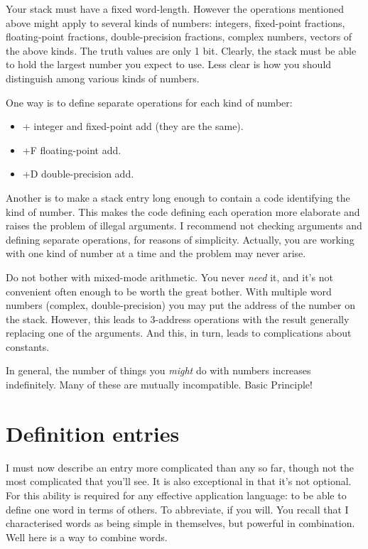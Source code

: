\documentclass[b5paper, oneside]{book}
\begin{document}
Your stack must have a fixed word-length. However the operations mentioned above might apply to several kinds of numbers: integers, fixed-point fractions, floating-point fractions, double-precision fractions, complex numbers, vectors of the above kinds. The truth values are only 1 bit. Clearly, the stack must be able to hold the largest number you expect to use. Less clear is how you should distinguish among various kinds of numbers.

One way is to define separate operations for each kind of number:\begin{itemize}
   \item + integer and fixed-point add (they are the same).
   \item +F floating-point add.
   \item +D double-precision add.\end{itemize}

Another is to make a stack entry long enough to contain a code identifying the kind of number. This makes the code defining each operation more elaborate and raises the problem of illegal arguments. I recommend not checking arguments and defining separate operations, for reasons of simplicity. Actually, you are working with one kind of number at a time and the problem may never arise.

Do not bother with mixed-mode arithmetic. You never {\em need} it, and it's not convenient often enough to be worth the great bother. With multiple word numbers (complex, double-precision) you may put the address of the number on the stack. However, this leads to 3-address operations with the result generally replacing one of the arguments. And this, in turn, leads to complications about constants.

In general, the number of things you {\em might} do with numbers increases indefinitely. Many of these are mutually incompatible. Basic Principle!

\section{Definition entries}
I must now describe an entry more complicated than any so far, though not the most complicated that you'll see. It is also exceptional in that it's not optional. For this ability is required for any effective application language: to be able to define one word in terms of others. To abbreviate, if you will. You recall that I characterised words as being simple in themselves, but powerful in combination. Well here is a way to combine words.
\end{document}
